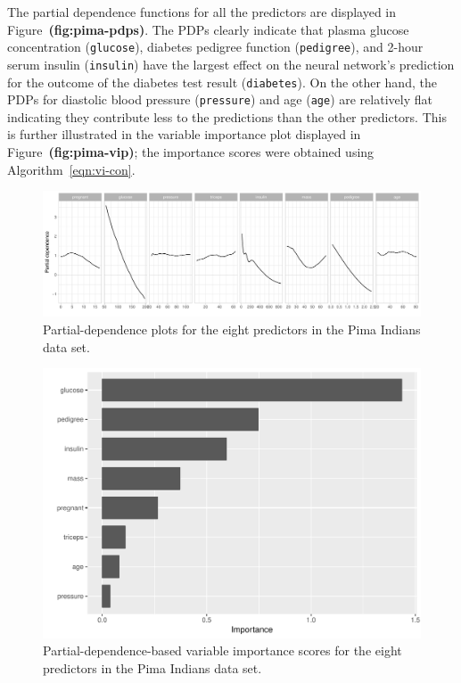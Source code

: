 \documentclass[12pt]{article}
\def\code#1{\texttt{#1}}
\def\ref#1{\textbf{(#1)}}
\begin{document}
The partial dependence functions for all the predictors are displayed in Figure~\ref{fig:pima-pdps}. The PDPs clearly indicate that plasma glucose concentration (\code{glucose}), diabetes pedigree function (\code{pedigree}), and 2-hour serum insulin (\code{insulin}) have the largest effect on the neural network's prediction for the outcome of the diabetes test result (\code{diabetes}). On the other hand, the PDPs for diastolic blood pressure (\code{pressure}) and age (\code{age}) are relatively flat indicating they contribute less to the predictions than the other predictors. This is further illustrated in the variable importance plot displayed in Figure~\ref{fig:pima-vip}; the importance scores were obtained using Algorithm~\eqref{eqn:vi-con}.

\begin{figure}[!htb]
  \centering
  \includegraphics[width=1.0\textwidth]{pima-pdps}
  \caption{Partial-dependence plots for the eight predictors in the Pima Indians data set. \label{fig:pima-pdps}}
\end{figure}

\begin{figure}[!htb]
  \centering
  \includegraphics[width=1.0\textwidth]{pima-vip}
  \caption{Partial-dependence-based variable importance scores for the eight predictors in the Pima Indians data set. \label{fig:pima-vip}}
\end{figure}
\end{document}
